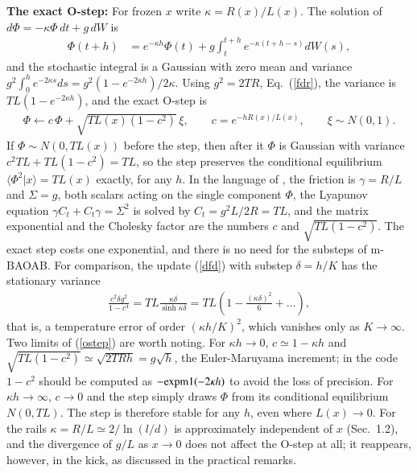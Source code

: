 \documentclass[11pt]{article}
\begin{document}
{\bf The exact O-step:} For frozen $x$ write $\kappa=R(x)/L(x)$. The solution of $d\Phi=-\kappa\Phi\,dt+g\,dW$ is
\begin{align}
  \Phi(t+h)&=e^{-\kappa h}\Phi(t)+g\int_t^{t+h}e^{-\kappa(t+h-s)}dW(s),
\end{align}
and the stochastic integral is a Gaussian with zero mean and variance $g^2\int_0^he^{-2\kappa s}ds=g^2(1-e^{-2\kappa h})/2\kappa$. Using $g^2=2TR$, Eq.~(\ref{fdr}), the variance is $TL(1-e^{-2\kappa h})$, and the exact O-step is
\begin{align}
  \Phi\leftarrow c\,\Phi+\sqrt{TL(x)\left(1-c^2\right)}\,\xi,\qquad c=e^{-hR(x)/L(x)},\qquad\xi\sim N(0,1).
  \label{ostep}
\end{align}
If $\Phi\sim N(0,TL(x))$ before the step, then after it $\Phi$ is Gaussian with variance $c^2TL+TL(1-c^2)=TL$, so the step preserves the conditional equilibrium $\langle\Phi^2|x\rangle=TL(x)$ exactly, for any $h$. In the language of \cite{sachs}, the friction is $\gamma=R/L$ and $\Sigma=g$, both scalars acting on the single component $\Phi$, the Lyapunov equation $\gamma C_t+C_t\gamma=\Sigma^2$ is solved by $C_t=g^2L/2R=TL$, and the matrix exponential and the Cholesky factor are the numbers $c$ and $\sqrt{TL(1-c^2)}$. The exact step costs one exponential, and there is no need for the substeps of m-BAOAB. For comparison, the update (\ref{dfd}) with substep $\delta=h/K$ has the stationary variance
\begin{align}
  \frac{c^2\delta g^2}{1-c^4}=TL\frac{\kappa\delta}{\sinh\kappa\delta}=TL\left(1-\frac{(\kappa\delta)^2}{6}+\dots\right),
\end{align}
that is, a temperature error of order $(\kappa h/K)^2$, which vanishes only as $K\to\infty$. Two limits of (\ref{ostep}) are worth noting. For $\kappa h\to0$, $c\simeq1-\kappa h$ and $\sqrt{TL(1-c^2)}\simeq\sqrt{2TRh}=g\sqrt{h}$, the Euler-Maruyama increment; in the code $1-c^2$ should be computed as $-{\rm expm1}(-2\kappa h)$ to avoid the loss of precision. For $\kappa h\to\infty$, $c\to0$ and the step simply draws $\Phi$ from its conditional equilibrium $N(0,TL)$. The step is therefore stable for any $h$, even where $L(x)\to0$. For the rails $\kappa=R/L\simeq2/\ln(l/d)$ is approximately independent of $x$ (Sec.~1.2), and the divergence of $g/L$ as $x\to0$ does not affect the O-step at all; it reappears, however, in the kick, as discussed in the practical remarks.
\end{document}
